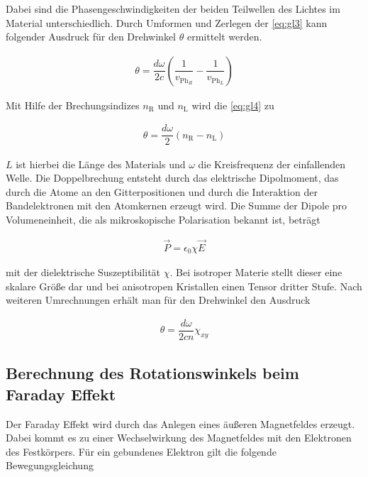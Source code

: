     Dabei sind die Phasengeschwindigkeiten der beiden Teilwellen des Lichtes im Material unterschiedlich.
    Durch Umformen und Zerlegen der \autoref{eq:gl3} kann folgender Ausdruck für den Drehwinkel $\theta$ ermittelt werden.

    \begin{align}
    \label{eq:gl4}
    \theta= \dfrac{d\omega}{2c} \left(\dfrac{1}{v_{\text{Ph}_R}}-\dfrac{1}{v_{\text{Ph}_L}}\right)
    \end{align}

    Mit Hilfe der Brechungsindizes $n_\text{R}$ und $n_\text{L}$ wird die \autoref{eq:gl4} zu

    \begin{align*}
    \theta= \dfrac{d\omega}{2} (n_\text{R}-n_\text{L})
    \end{align*}

    $L$ ist hierbei die Länge des Materials und $\omega$ die Kreisfrequenz der einfallenden Welle. 
    Die Doppelbrechung entsteht durch das elektrische Dipolmoment, das durch die Atome an den Gitterpositionen und durch die Interaktion der Bandelektronen mit den Atomkernen erzeugt wird. Die Summe der Dipole pro Volumeneinheit, die als mikroskopische Polarisation bekannt ist, beträgt

    \begin{align*}
    \vec{P}=\epsilon_0 \chi \vec{E}
    \end{align*}

     mit der dielektrische Suszeptibilität $\chi$. Bei isotroper Materie stellt dieser eine skalare Größe dar und bei anisotropen Kristallen
    einen Tensor dritter Stufe. Nach weiteren Umrechnungen erhält man für den Drehwinkel den Ausdruck

    \begin{align*}
    \theta= \dfrac{d\omega}{2cn}\chi_{xy}
    \end{align*}

    \newpage

    \subsection{Berechnung des Rotationswinkels beim Faraday Effekt}

    Der Faraday Effekt wird durch das Anlegen eines äußeren Magnetfeldes erzeugt.
    Dabei kommt es zu einer Wechselwirkung des Magnetfeldes mit den Elektronen des Festkörpers. Für ein gebundenes Elektron gilt die
    folgende Bewegungsgleichung

